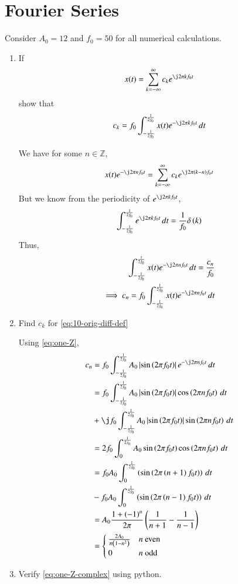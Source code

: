 \documentclass[journal,12pt,twocolumn]{IEEEtran}
\renewcommand\thesection{\arabic{section}}
\begin{document}
	\section{Fourier Series}
	Consider $A_0 =12$ and $f_0 = 50$ for all numerical calculations.
	\begin{enumerate}[label=\thesection.\arabic*,ref=\thesection.\theenumi]
		\item If
		\begin{align}
			x(t) = \sum_{k = -\infty}^{\infty}c_ke^{\j2\pi kf_0 t}
			\label{eq:one-Z-complex}
		\end{align}
		show that 
		\begin{align}
			c_k = f_0\int_{-\frac{1}{2f_0}}^{\frac{1}{2f_0}}x(t)e^{-\j2\pi kf_0 t}\, dt
			\label{eq:one-Z}
		\end{align}
		
		\solution We have for some $n \in \mathbb{Z}$,
		\begin{align}
			x(t)e^{-\j2\pi nf_0t} = \sum_{k = -\infty}^{\infty}c_ke^{\j2\pi (k - n)f_0 t}
		\end{align}
		But we know from the periodicity of $e^{\j2\pi kf_0t}$,
		\begin{align}
			\int_{-\frac{1}{2f_0}}^{\frac{1}{2f_0}}e^{\j2\pi kf_0 t}\, dt = 
			\frac{1}{f_0}\delta\brak{k} 
		\end{align}
		Thus,
		\begin{align}
			\int_{-\frac{1}{2f_0}}^{\frac{1}{2f_0}}x(t)e^{-\j2\pi nf_0 t}\, dt = 
			\frac{c_n}{f_0} \\
			\implies c_n = f_0\int_{-\frac{1}{2f_0}}^{\frac{1}{2f_0}}x(t)e^{-\j2\pi nf_0 t}\, dt 
		\end{align}
		\item Find $c_k$ for \eqref{eq:10-orig-diff-def}
		
		\solution Using \eqref{eq:one-Z},
		\begin{align}
			c_n &= f_0\int_{-\frac{1}{2f_0}}^{\frac{1}{2f_0}}A_0\abs{\sin\brak{2\pi f_0t}}
			e^{-\j2\pi nf_0t}\, dt \\
			&= f_0\int_{-\frac{1}{2f_0}}^{\frac{1}{2f_0}}A_0\abs{\sin\brak{2\pi f_0t}}
			\cos\brak{2\pi nf_0t}\, dt \nonumber \\
			&+ \j f_0\int_{-\frac{1}{2f_0}}^{\frac{1}{2f_0}}A_0
			\abs{\sin\brak{2\pi f_0t}}\sin\brak{2\pi nf_0t}\, dt \\
			&= 2f_0\int_{0}^{\frac{1}{2f_0}}A_0\sin\brak{2\pi f_0t}\cos\brak{2\pi nf_0t}\, dt \\
			&= f_0A_0\int_{0}^{\frac{1}{2f_0}}\brak{\sin\brak{2\pi\brak{n+1}f_0t}}\, dt \nonumber \\ 
			&- f_0A_0\int_{0}^{\frac{1}{2f_0}}\brak{\sin\brak{2\pi\brak{n-1}f_0t}}\, dt \\ 
			&= A_0\frac{1+\brak{-1}^n}{2\pi}\brak{\frac{1}{n+1} - \frac{1}{n-1}} \\
			&= 
			\begin{cases}
				\frac{2A_0}{\pi\brak{1-n^2}} & n\ \text{even} \\
				0 & n\ \text{odd}
			\end{cases}
			\label{eq:ck-xt}
		\end{align}
		\item Verify 
		\eqref{eq:one-Z-complex}
		using python.
		

\end{enumerate}
\end{document}
